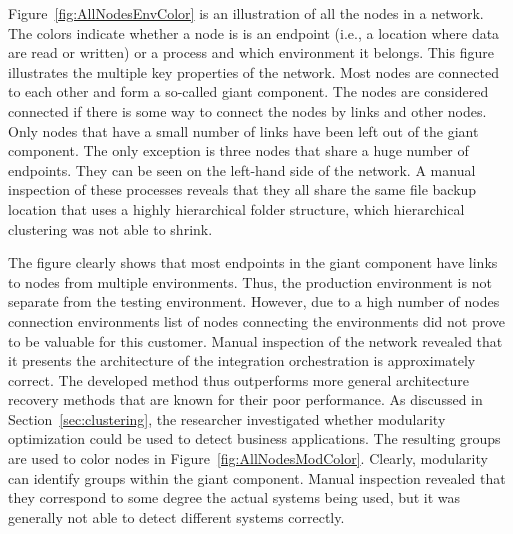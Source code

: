 \documentclass[english, 12pt, a4paper, sci, utf8, a-2b, online, obeyspaces]{aaltothesis}
\begin{document}
Figure~\ref{fig:AllNodesEnvColor} is an illustration of all the nodes in a network. The colors indicate whether a node is is an endpoint (i.e., a location where data are read or written) or a process and which environment it belongs. This figure illustrates the multiple key properties of the network. Most nodes are connected to each other and form a so-called giant component. The nodes are considered connected if there is some way to connect the nodes by links and other nodes. Only nodes that have a small number of links have been left out of the giant component. The only exception is three nodes that share a huge number of endpoints. They can be seen on the left-hand side of the network. A manual inspection of these processes reveals that they all share the same file backup location that uses a highly hierarchical folder structure, which hierarchical clustering was not able to shrink.

The figure clearly shows that most endpoints in the giant component have links to nodes from multiple environments. Thus, the production environment is not separate from the testing environment. However, due to a high number of nodes connection environments list of nodes connecting the environments did not prove to be valuable for this customer. Manual inspection of the network revealed that it presents the architecture of the integration orchestration is approximately correct. The developed method thus outperforms more general architecture recovery methods that are known for their poor performance. As discussed in Section~\ref{sec:clustering}, the researcher investigated whether modularity optimization could be used to detect business applications. The resulting groups are used to color nodes in Figure~\ref{fig:AllNodesModColor}. Clearly, modularity can identify groups within the giant component. Manual inspection revealed that they correspond to some degree the actual systems being used, but it was generally not able to detect different systems correctly.
\end{document}
